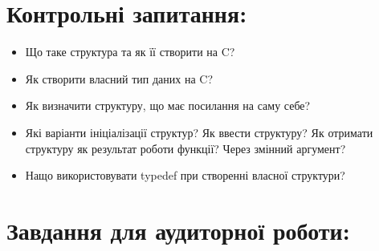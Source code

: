\documentclass[a5paper,titlepage,openany,twoside,
]
{book_unv}%
\begin{document}
\section{Контрольні запитання:}
\begin{itemize}
\item Що таке структура та як її створити на C?
\item Як створити власний тип даних на C?
\item Як визначити структуру, що має посилання на саму себе?
\item Які варіанти ініціалізації структур? Як ввести структуру? Як отримати
структуру як результат роботи функції? Через змінний аргумент?
\item Нащо використовувати typedef при створенні власної структури?
\end{itemize}

\section{Завдання для аудиторної роботи:}
\end{document}
